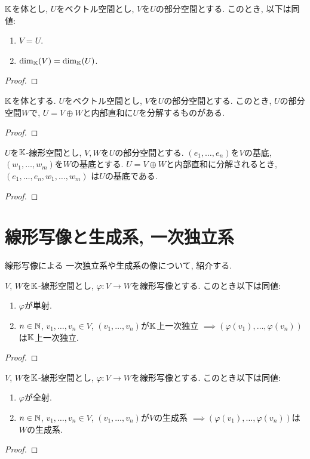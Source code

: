 \begin{cor}
$\mathbb{K}$を体とし,
  $U$をベクトル空間とし,
  $V$を$U$の部分空間とする.
  このとき, 以下は同値:
  \begin{enumerate}
   \item $V = U$.
   \item $\dim_{\mathbb{K}}(V) = \dim_{\mathbb{K}}(U)$.
  \end{enumerate}
\end{cor}
\begin{proof}\end{proof}

\begin{prop}
$\mathbb{K}$を体とする.
  $U$をベクトル空間とし, $V$を$U$の部分空間とする.
  このとき, $U$の部分空間$W$で,
  $U=V\oplus W$と内部直和に$U$を分解するものがある.
\end{prop}
\begin{proof}\end{proof}

\begin{prop}
  $U$を$\mathbb{K}$-線形空間とし,
  $V, W$を$U$の部分空間とする.
  $(e_1,\ldots,e_n)$を$V$の基底,
  $(w_1,\ldots,w_m)$を$W$の基底とする.
  $U=V\oplus W$と内部直和に分解されるとき,
  $(e_1,\ldots,e_n,w_1,\ldots,w_m)$
  は$U$の基底である.
\end{prop}
\begin{proof}\end{proof}

\section{線形写像と生成系, 一次独立系}
\label{sec:basis:linmap}

線形写像による
一次独立系や生成系の像について,
紹介する.
\begin{prop}
  $V$, $W$を$\mathbb{K}$-線形空間とし,
  $\varphi\colon V\to W$を線形写像とする.
  このとき以下は同値:
  \begin{enumerate}
  \item $\varphi$が単射.
  \item $n\in \mathbb{N}$, $v_1,\ldots,v_n\in V$,
    $(v_1,\ldots,v_n)$が$\mathbb{K}$上一次独立
    $\implies (\varphi(v_1),\ldots,\varphi(v_n))$は$\mathbb{K}$上一次独立.
  \end{enumerate}
\end{prop}
\begin{proof}\end{proof}

\begin{prop}
  $V$, $W$を$\mathbb{K}$-線形空間とし,
  $\varphi\colon V\to W$を線形写像とする.
  このとき以下は同値:
  \begin{enumerate}
  \item $\varphi$が全射.
  \item $n\in \mathbb{N}$, $v_1,\ldots,v_n\in V$,
    $(v_1,\ldots,v_n)$が$V$の生成系
    $\implies (\varphi(v_1),\ldots,\varphi(v_n))$は$W$の生成系.
  \end{enumerate}
\end{prop}
\begin{proof}\end{proof}

